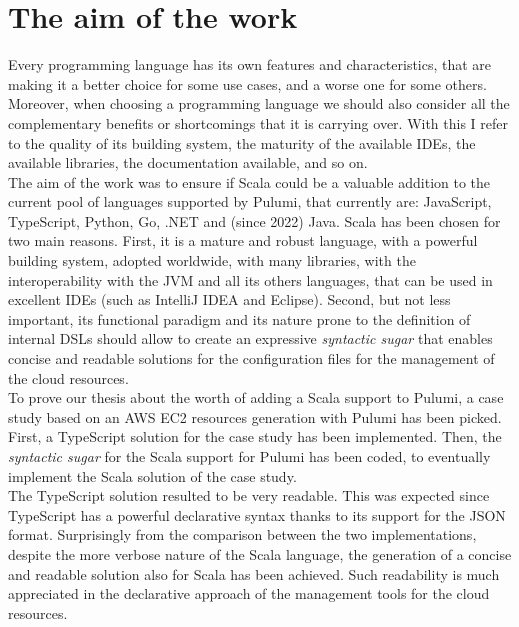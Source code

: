 \section{The aim of the work}
Every programming language has its own features and characteristics, that are making it a better choice for some use cases, and a worse one for some others.
Moreover, when choosing a programming language we should also consider all the complementary benefits or shortcomings that it is carrying over.
With this I refer to the quality of its building system, the maturity of the available IDEs, the available libraries, the documentation available, and so on.\\
The aim of the work was to ensure if Scala could be a valuable addition to the current pool of languages supported by Pulumi, that currently are: JavaScript, TypeScript, Python, Go, .NET and  (since 2022) Java.
Scala has been chosen for two main reasons.
First, it is a mature and robust language, with a powerful building system, adopted worldwide, with many libraries, with the interoperability with the JVM and all its others languages, that can be used in excellent IDEs (such as IntelliJ IDEA and Eclipse).
Second, but not less important, its functional paradigm and its nature prone to the definition of \gls{internal DSL}s should allow to create an expressive \textit{syntactic sugar} that enables concise and readable solutions for the configuration files for the management of the cloud resources.\\
To prove our thesis about the worth of adding a Scala support to Pulumi, a case study based on an AWS EC2 resources generation with Pulumi has been picked.
First, a TypeScript solution for the case study has been implemented.
Then, the \textit{syntactic sugar} for the Scala support for Pulumi has been coded, to eventually implement the Scala solution of the case study.\\
The TypeScript solution resulted to be very readable. This was expected since TypeScript has a powerful declarative syntax thanks to its support for the JSON format.
Surprisingly from the comparison between the two implementations, despite the more verbose nature of the Scala language, the generation of a concise and readable solution also for Scala has been achieved.
Such readability is much appreciated in the declarative approach of the management tools for the cloud resources.
